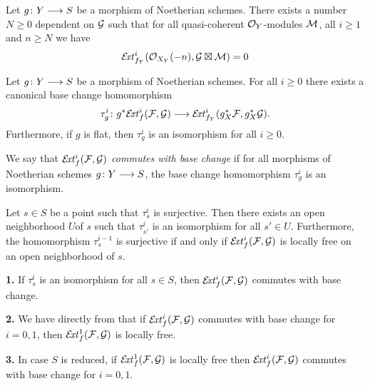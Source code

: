 \begin{proposition}
	Let $g \colon Y \longrightarrow S$ be a morphism of Noetherian schemes.
	There exists a number $N\geq 0$ dependent on $\mathcal{G}$ such that for all quasi-coherent $\mathcal{O}_Y$-modules $\mathcal{M}$, all $i\geq 1$ and $n\geq N$ we have
	\[
		\mathcal{E}\!\mathit{xt}^i_{f_Y}(\mathcal{O}_{X_Y}(-n),\mathcal{G} \boxtimes \mathcal{M}) = 0
	\]
\end{proposition}

\begin{proposition}
	Let $g \colon Y \longrightarrow S$ be a morphism of Noetherian schemes.
	For all $i\geq 0$ there exists a canonical base change homomorphism
	\[
		\tau^i_{g} \colon g^{*}\mathcal{E}\!\mathit{xt}^i_{f}
		(\mathcal{F},\mathcal{G})
		\longrightarrow
		\mathcal{E}\!\mathit{xt}^i_{f_Y}
		(g_X^{*}\mathcal{F}, g_X^{*}\mathcal{G}).
	\]
	Furthermore, if $g$ is flat, then $\tau^i_g$ is an isomorphism for all $i\geq 0$.
\end{proposition}

\begin{definition}
	We say that $\mathcal{E}\!\mathit{xt}^i_{f}(\mathcal{F},\mathcal{G})$ \emph{commutes with base change} if for all morphisms of Noetherian schemes $g \colon Y \longrightarrow S$, the base change homomorphism $\tau^i_g$ is an isomorphism.
\end{definition}

\begin{proposition}
\label{prop:ext-base-change}
	Let $s \in S$ be a point such that $\tau^i_s$ is surjective. Then there exists an open neighborhood $U$of $s$ such that $\tau^i_{s'}$ is an isomorphism for all $s'\in U$.
	Furthermore, the homomorphism $\tau^{i-1}_{s}$ is surjective if and only if $\mathcal{E}\!\mathit{xt}^i_{f}(\mathcal{F},\mathcal{G})$ is locally free on an open neighborhood of $s$.
\end{proposition}

\begin{remark}

	\textbf{1.} If $\tau^i_{s}$ is an isomorphism for all $s\in S$, then $\mathcal{E}\!\mathit{xt}_{f}^i(\mathcal{F},\mathcal{G})$ commutes with base change.

	\textbf{2.} We have directly from  that if $\mathcal{E}\!\mathit{xt}^i_f(\mathcal{F},\mathcal{G})$ commutes with base change for $i=0,1$, then $\mathcal{E}\!\mathit{xt}^1_f(\mathcal{F},\mathcal{G})$ is locally free.

	\textbf{3.} In case $S$ is reduced, if $\mathcal{E}\!\mathit{xt}^1_f(\mathcal{F},\mathcal{G})$ is locally free then $\mathcal{E}\!\mathit{xt}^i_f(\mathcal{F},\mathcal{G})$ commutes with base change for $i=0,1$.
\end{remark}

